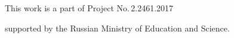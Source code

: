 















\vspace*{-6pt}





\Ack


\noindent


This work is a part of Project No.\,2.2461.2017 


supported by the Russian Ministry of Education and Science.











\vspace*{3pt}





